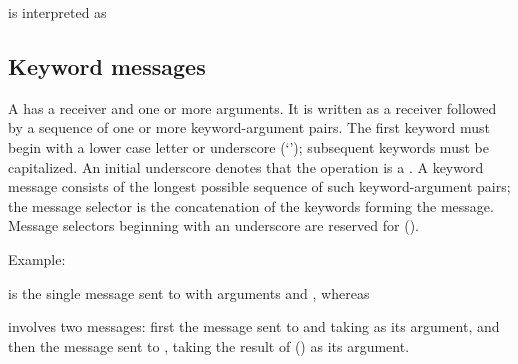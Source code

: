 \documentclass[letterpaper,10pt,english]{sphinxmanual}
\begin{document}
is interpreted as

\begin{sphinxVerbatim}[commandchars=\\\{\}]
    
\end{sphinxVerbatim}


\subsection{Keyword messages}
\label{\detokenize{langref:keyword-messages}}\label{\detokenize{langref:pp-keyword-messages}}\label{\detokenize{langref:index-50}}
A  has a receiver and one or more arguments. It is written as a receiver followed by a sequence of one or more keyword-argument pairs. The first keyword must begin with a lower case letter or underscore (‘\sphinxcode{\_}’); subsequent keywords must be capitalized. An initial underscore denotes that the operation is a . A keyword message consists of the longest possible sequence of such keyword-argument pairs; the message selector is the concatenation of the keywords forming the message. Message selectors beginning with an underscore are reserved for  ({\hyperref[\detokenize{primitives:pp-primitives}]{}}).

Example:

\begin{sphinxVerbatim}[commandchars=\\\{\}]
    
\end{sphinxVerbatim}

is the single message  sent to  with arguments  and , whereas

\begin{sphinxVerbatim}[commandchars=\\\{\}]
    
\end{sphinxVerbatim}

involves two messages: first the message  sent to  and taking  as its argument, and then the message  sent to , taking the result of () as its argument.
\end{document}
